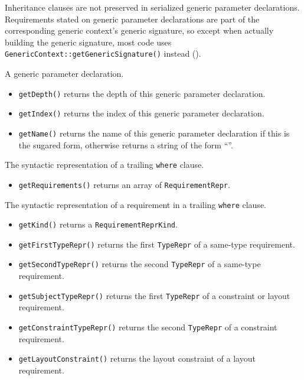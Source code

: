 \documentclass[../generics]{subfiles}
\begin{document}
Inheritance clauses are not preserved in serialized generic parameter declarations. Requirements stated on generic parameter declarations are part of the corresponding generic context's generic signature, so except when actually building the generic signature, most code uses \texttt{GenericContext::getGenericSignature()} instead ().

A generic parameter declaration.
\begin{itemize}
\item \texttt{getDepth()} returns the depth of this generic parameter declaration.
\item \texttt{getIndex()} returns the index of this generic parameter declaration.
\item \texttt{getName()} returns the name of this generic parameter declaration if this is the sugared form, otherwise returns a string of the form ``''.
\end{itemize}

The syntactic representation of a trailing \texttt{where} clause.
\begin{itemize}
\item \texttt{getRequirements()} returns an array of \texttt{RequirementRepr}.
\end{itemize}

The syntactic representation of a requirement in a trailing \texttt{where} clause.
\begin{itemize}
\item \texttt{getKind()} returns a \texttt{RequirementReprKind}.
\item \texttt{getFirstTypeRepr()} returns the first \texttt{TypeRepr} of a same-type requirement.
\item \texttt{getSecondTypeRepr()} returns the second \texttt{TypeRepr} of a same-type requirement.
\item \texttt{getSubjectTypeRepr()} returns the first \texttt{TypeRepr} of a constraint or layout requirement.
\item \texttt{getConstraintTypeRepr()} returns the second \texttt{TypeRepr} of a constraint requirement.
\item \texttt{getLayoutConstraint()} returns the layout constraint of a layout requirement.
\end{itemize}
\end{document}
